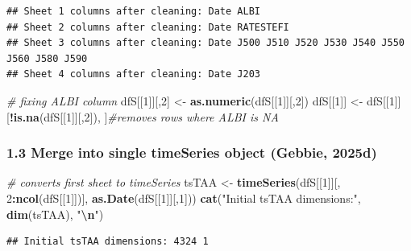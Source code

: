 \documentclass[
  12pt,
]{article}
\newenvironment{Shaded}{\begin{snugshade}}{\end{snugshade}}
\newcommand{\CommentTok}[1]{\textcolor[rgb]{0.56,0.35,0.01}{\textit{#1}}}
\newcommand{\DecValTok}[1]{\textcolor[rgb]{0.00,0.00,0.81}{#1}}
\newcommand{\FunctionTok}[1]{\textcolor[rgb]{0.13,0.29,0.53}{\textbf{#1}}}
\newcommand{\NormalTok}[1]{#1}
\newcommand{\OtherTok}[1]{\textcolor[rgb]{0.56,0.35,0.01}{#1}}
\newcommand{\SpecialCharTok}[1]{\textcolor[rgb]{0.81,0.36,0.00}{\textbf{#1}}}
\newcommand{\StringTok}[1]{\textcolor[rgb]{0.31,0.60,0.02}{#1}}
\begin{document}
\begin{verbatim}
## Sheet 1 columns after cleaning: Date ALBI 
## Sheet 2 columns after cleaning: Date RATESTEFI 
## Sheet 3 columns after cleaning: Date J500 J510 J520 J530 J540 J550 J560 J580 J590 
## Sheet 4 columns after cleaning: Date J203
\end{verbatim}

\begin{Shaded}
\begin{Highlighting}[]
\CommentTok{\# fixing ALBI column}
\NormalTok{dfS[[}\DecValTok{1}\NormalTok{]][,}\DecValTok{2}\NormalTok{] }\OtherTok{\textless{}{-}} \FunctionTok{as.numeric}\NormalTok{(dfS[[}\DecValTok{1}\NormalTok{]][,}\DecValTok{2}\NormalTok{])  }
\NormalTok{dfS[[}\DecValTok{1}\NormalTok{]] }\OtherTok{\textless{}{-}}\NormalTok{ dfS[[}\DecValTok{1}\NormalTok{]][}\SpecialCharTok{!}\FunctionTok{is.na}\NormalTok{(dfS[[}\DecValTok{1}\NormalTok{]][,}\DecValTok{2}\NormalTok{]), ]}\CommentTok{\#removes rows where ALBI is NA}
\end{Highlighting}
\end{Shaded}

\subsubsection{1.3 Merge into single timeSeries object (Gebbie,
2025d)}\label{merge-into-single-timeseries-object-tim_prep}

\begin{Shaded}
\begin{Highlighting}[]
\CommentTok{\# converts first sheet to timeSeries}
\NormalTok{tsTAA }\OtherTok{\textless{}{-}} \FunctionTok{timeSeries}\NormalTok{(dfS[[}\DecValTok{1}\NormalTok{]][, }\DecValTok{2}\SpecialCharTok{:}\FunctionTok{ncol}\NormalTok{(dfS[[}\DecValTok{1}\NormalTok{]])], }\FunctionTok{as.Date}\NormalTok{(dfS[[}\DecValTok{1}\NormalTok{]][,}\DecValTok{1}\NormalTok{]))}
\FunctionTok{cat}\NormalTok{(}\StringTok{"Initial tsTAA dimensions:"}\NormalTok{, }\FunctionTok{dim}\NormalTok{(tsTAA), }\StringTok{"}\SpecialCharTok{\textbackslash{}n}\StringTok{"}\NormalTok{)}
\end{Highlighting}
\end{Shaded}

\begin{verbatim}
## Initial tsTAA dimensions: 4324 1
\end{verbatim}
\end{document}
